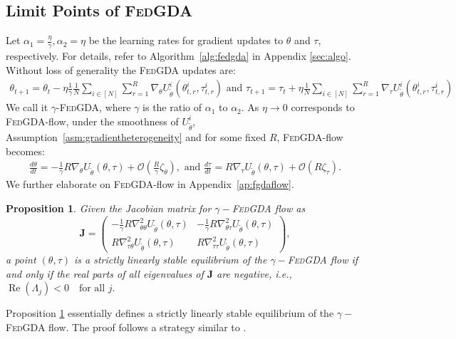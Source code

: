 \documentclass{article}
\let\cite\relax
\newcommand*{\cite}{\citep}
\def\mJ{{\bm{J}}}
\def\gO{{\mathcal{O}}}
\def\emLambda{{\Lambda}}
\newcommand{\fgda}{\textsc{FedGDA}\xspace}
\newtheorem{proposition}{Proposition}%
\theoremstyle{definition}
\begin{document}
\subsection{Limit Points of \fgda}
Let $\alpha_1= \frac{\eta}{\gamma}, \alpha_2={\eta}$ be the learning rates for gradient updates to $\theta$ and $\tau$, respectively. For details, refer to Algorithm~\ref{alg:fedgda} in Appendix \ref{sec:algo}. Without loss of generality the \fgda updates are:
\begin{align}
\theta_{t+1}=\theta_{t}-\eta\frac{1}{\gamma}\frac{1}{N}\sum_{i\in[N]}\sum_{r=1}^{R}\nabla_{\theta}U_{\tilde\theta}^i(\theta_{t,r}^i, \tau_{t,r}^i)\text{  and }
\tau_{t+1}=\tau_{t}+\eta\frac{1}{N}\sum_{i\in[N]}\sum_{r=1}^{R}\nabla_{\tau}U_{\tilde\theta}^i(\theta_{t,r}^i, \tau_{t,r}^i)
\end{align}
We call it $\gamma$-\fgda, where $\gamma$ is the ratio of $\alpha_1$ to $\alpha_2$. As $\eta\rightarrow 0$ corresponds to \fgda-flow,
under the smoothness of $U_{\tilde\theta}^i$, Assumption~\ref{asm:gradientheterogeneity} and for some fixed $R$, \fgda-flow becomes:
\begin{align}
    \frac{d\theta}{dt} = - \frac{1}{\gamma} {R}\nabla_{\theta} U_{\tilde\theta}(\theta, \tau)+ \gO\left(\frac{R}{\gamma}  \zeta_{\theta}\right), \text{  and }
    \frac{d\tau}{dt} =  R \nabla_{\tau} U_{\tilde\theta}(\theta, \tau)+ \gO(R\zeta_{\tau}).
\end{align}
We further elaborate on \fgda-flow in Appendix~\ref{ap:fgdaflow}.
\begin{proposition}\label{prop:stricteqm}
    Given the Jacobian matrix for $\gamma-$\fgda flow as
    \begin{equation*}
        \mJ=\begin{pmatrix}
            {-\frac{1}{\gamma}R\nabla_{\theta\theta}^2U_{\tilde\theta}(\theta, \tau)}&{-\frac{1}{\gamma}R\nabla_{\theta\tau}^2U_{\tilde\theta}(\theta, \tau)}\\
            {R \nabla_{\tau\theta}^2 U_{\tilde\theta}(\theta, \tau)}& {R \nabla_{\tau\tau}^2 U_{\tilde\theta}(\theta, \tau)}   
        \end{pmatrix},
    \end{equation*}
     a point $(\theta,\tau)$ is a strictly linearly stable equilibrium of the $\gamma-$\fgda flow if and only if the real parts of all eigenvalues of $\mathbf{J}$ are negative, i.e., 
    $\operatorname{Re}(\emLambda_j) < 0 \quad \text{for all } j.$
    \end{proposition}
Proposition \ref{prop:stricteqm} essentially defines a strictly linearly stable equilibrium of the $\gamma-$\fgda flow. The proof follows a strategy similar to \cite{pmlr-v119-jin20e}. 
\end{document}
